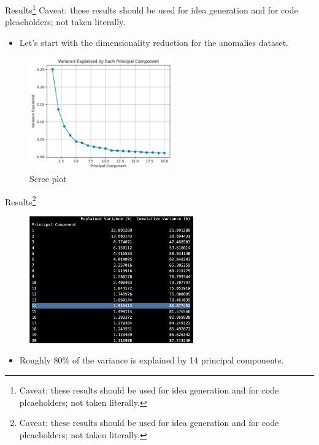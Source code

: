 \documentclass[dvipsnames,mathserif, handout]{beamer}
\begin{document}
{\begin{frame}{Results\footnote{\tiny Caveat: these results should be used for idea generation and for code plcaeholders; not taken literally.}}
	{\tiny Caveat: these results should be used for idea generation and for code plcaeholders; not taken literally.}
	\begin{itemize}
		\item Let's start with the dimensionality reduction for the anomalies dataset.
	\end{itemize}
	\begin{figure}[!ht]
		\includegraphics[width=175pt]{scree_plot.pdf}
		\caption{\footnotesize Scree plot}
	\end{figure}
\end{frame}	

\begin{frame}{Results\footnote{\tiny Caveat: these results should be used for idea generation and for code plcaeholders; not taken literally.}}
	\begin{figure}[!ht]
		\includegraphics[width=200pt]{explained_variance.pdf}
	\end{figure}
	\begin{itemize}
		\item Roughly 80\% of the variance is explained by 14 principal components. 
	\end{itemize}
\end{frame}	

}
\end{document}

